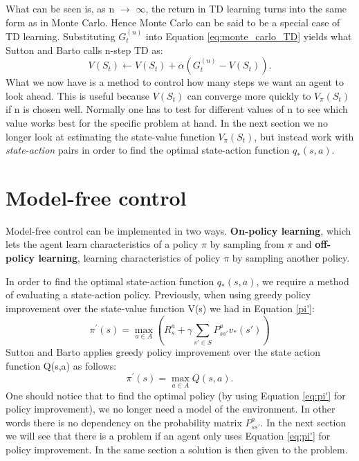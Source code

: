 What can be seen is, as n $\to$ $\infty$, the return in TD learning turns into the same form as in Monte Carlo. Hence Monte Carlo can be said to be a special case of TD learning.
Substituting $G_{t}^{(n)}$ into Equation \ref{eq:monte_carlo_TD} yields what Sutton and Barto calls n-step TD as:
\begin{equation}
	V(S_t) \gets V(S_t) + \alpha(G_t^{(n)} - V(S_t)).
	\label{eq:n_step_TD}
\end{equation} 
What we now have is a method to control how many steps we want an agent to look ahead. This is useful because $V(S_t)$ can converge more quickly to $V_\pi(S_t)$ if n is chosen well. Normally one has to test for different values of n to see which value works best for the specific problem at hand.
In the next section we no longer look at estimating the state-value function $V_\pi(S_t)$, but instead work with \textit{state-action} pairs in order to find the optimal state-action function $q_*(s,a)$.

\section{Model-free control}
Model-free control can be implemented in two ways. \textbf{On-policy learning}, which lets the agent learn characteristics of a policy $\pi$ by sampling from $\pi$ and
\textbf{off-policy learning}, learning characteristics of policy $\pi$ by sampling another policy.

\noindent In order to find the optimal state-action function $q_*(s,a)$, we require a method of evaluating a state-action policy. Previously, when using greedy policy improvement over the state-value function V(s) we had in Equation \ref{pi'}:
\[\pi^{'}(s) = \max\limits_{a \in A}(R^{a}_s+\gamma\sum_{s'\in S}P^{a}_{ss'}v_*(s'))\]
Sutton and Barto applies greedy policy improvement over the state action function Q(s,a) as follows:
\begin{equation}
	\pi^{'}(s) = \max\limits_{a \in A}Q(s,a).
	\label{eq:pi'}
\end{equation}
One should notice that to find the optimal policy (by using Equation \ref{eq:pi'} for policy improvement), we no longer need a model of the environment. In other words there is no dependency on the probability matrix $P^{a}_{ss'}$. In the next section we will see that there is a problem if an agent only uses Equation \ref{eq:pi'} for policy improvement. In the same section a solution is then given to the problem.

